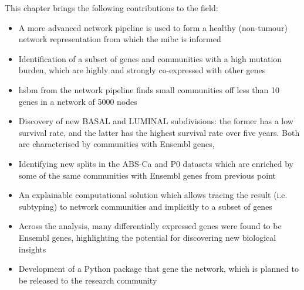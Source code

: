 This chapter brings the following contributions to the field:
\begin{itemize}
    \item A more advanced network pipeline is used to form a healthy (non-tumour) network representation from which the \acrshort{mibc} is informed
    \item Identification of a subset of genes and communities with a high mutation burden, which are highly and strongly co-expressed with other genes
    \item \acrfull{hsbm} from the network pipeline finds small communities off less than 10 genes in a network of 5000 nodes
    \item Discovery of new \gls{BASAL} and \gls{LUMINAL} subdivisions: the former has a low survival rate, and the latter has the highest survival rate over five years. Both are characterised by communities with Ensembl genes,
    \item Identifying new splits in the ABS-Ca and P0 datasets which are enriched by some of the same communities with Ensembl genes from previous point 
    \item An explainable computational solution which allows tracing the result (i.e. subtyping) to network communities and implicitly to a subset of genes
    \item Across the analysis, many differentially expressed genes were found to be Ensembl genes, highlighting the potential for discovering new biological insights
    \item Development of a Python package that gene the network, which is planned to be released to the research community
\end{itemize}


\newpage


